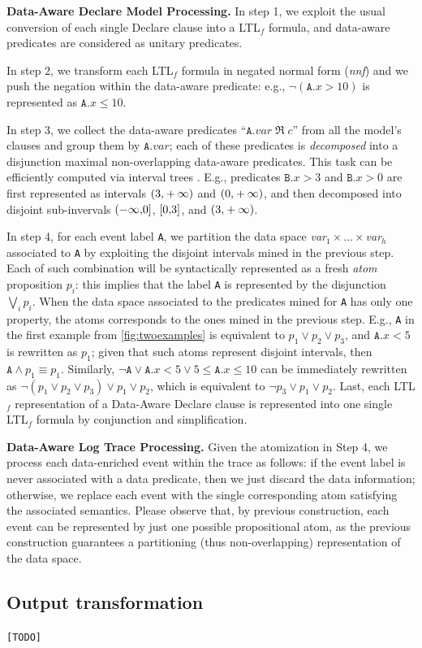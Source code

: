 \textbf{Data-Aware Declare Model Processing.} In step 1, we exploit the usual conversion of each single Declare clause into a LTL$_f$ formula, and data-aware predicates are considered as unitary predicates. 

In step 2, we transform each LTL$_f$ formula in negated normal form (\textit{nnf}) and we push the negation within the data-aware predicate: e.g., $\neg(\texttt{A}.x>10)$ is represented as $\texttt{A}.x\leq 10$.

In step 3, we collect the data-aware predicates ``$\texttt{A}.\textit{var}\;\Re\;c$'' from all the model's clauses and group them by $\texttt{A}.\textit{var}$; each of these predicates is \textit{decomposed} into a disjunction maximal non-overlapping data-aware predicates. This task can be efficiently computed via interval trees \cite{inttree}. E.g., predicates $\texttt{B}.x>3$ and $\texttt{B}.x>0$ are first represented as intervals $\interval({3,+\infty})$ and $\interval({0,+\infty})$, and then decomposed into disjoint sub-invervals $\interval({-\infty,0}]$, $\interval[{0,3}]$, and $\interval({3,+\infty})$. 

In step 4, for each event label \texttt{A}, we partition the data space \textit{var}$_1\times\dots\times$\textit{var}$_h$ associated to \texttt{A} by exploiting the disjoint intervals mined in the previous step. Each of such combination will be syntactically represented as a fresh \textit{atom}  proposition $p_i$: this implies that the label \texttt{A} is represented by the disjunction $\bigvee_ip_i$. When the data space associated to the predicates mined for \texttt{A} has only one property,  the atoms corresponds to the ones mined in the previous step. E.g., \texttt{A} in the first example from \ref{fig:twoexamples} is equivalent to $p_1\vee p_2\vee p_3$, and $\texttt{A}.\textit{x}<5$ is rewritten as $p_1$; given that such atoms represent disjoint intervals, then $\texttt{A}\wedge p_1\equiv p_1$. Similarly, $\neg \texttt{A}\vee \texttt{A}.\textit{x}<5\vee 5\leq\texttt{A}.\textit{x}\leq 10$ can be immediately rewritten as $\neg(p_1\vee p_2\vee p_3)\vee p_1\vee p_2$, which is equivalent to $\neg p_3\vee p_1\vee p_2$. Last, each LTL$_f$ representation of a Data-Aware Declare clause is represented into one single LTL$_f$ formula by conjunction and simplification.

\textbf{Data-Aware Log Trace Processing.} Given the atomization in Step 4, we process each data-enriched event within the trace as follows: if the event label is never associated with a data predicate, then we just discard the data information; otherwise, we replace each event with the single corresponding atom satisfying the associated semantics. Please observe that, by previous construction, each event can be represented by just one possible propositional atom, as the previous construction guarantees a partitioning (thus non-overlapping) representation of the data space.

\subsection{Output transformation} \texttt{\color{red}[TODO]}